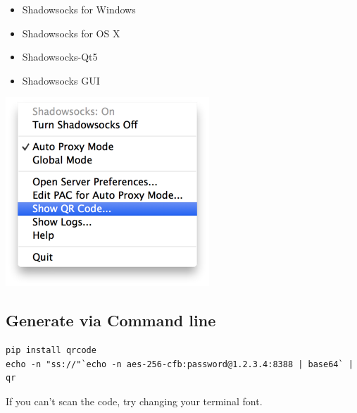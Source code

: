\documentclass[11pt,a4paper]{sphinxmanual}
\begin{document}
\begin{itemize}
\item Shadowsocks for Windows
\item Shadowsocks for OS X
\item Shadowsocks-Qt5
\item Shadowsocks GUI
\end{itemize}

\includegraphics[keepaspectratio,max width=0.95\linewidth]{images/a345d9d4-51d6-11e4-94e8-a13a987567e7.png}


\subsection{Generate via Command line}
\label{sec-5-2-3}
\begin{Verbatim}
pip install qrcode
echo -n "ss://"`echo -n aes-256-cfb:password@1.2.3.4:8388 | base64` | qr
\end{Verbatim}


If you can't scan the code, try changing your terminal font.
\end{document}
